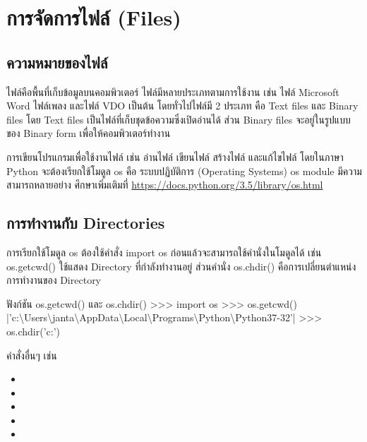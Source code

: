\chapter{การจัดการไฟล์ (Files)}
\section{ความหมายของไฟล์}

ไฟล์คือพื้นที่เก็บข้อมูลบนคอมพิวเตอร์ ไฟล์มีหลายประเภทตามการใช้งาน เช่น ไฟล์ Microsoft Word ไฟล์เพลง และไฟล์ VDO เป็นต้น โดยทั่วไปไฟล์มี 2 ประเภท คือ Text files และ Binary files โดย Text files เป็นไฟล์ที่เก็บชุดข้อความซึ่งเปิดอ่านได้ ส่วน Binary files จะอยู่ในรูปแบบของ Binary form เพื่อให้คอมพิวเตอร์ทำงาน

การเขียนโปรแกรมเพื่อใช้งานไฟล์ เช่น อ่านไฟล์ เขียนไฟล์ สร้างไฟล์ และแก้ไขไฟล์ โดยในภาษา Python จะต้องเรียกใช้โมดูล os คือ ระบบปฏิบัติการ (Operating Systems) os module มีความสามารถหลายอย่าง ศึกษาเพิ่มเติมที่ \url{https://docs.python.org/3.5/library/os.html}

\section{การทำงานกับ Directories}

การเรียกใช้โมดูล os ต้องใช้คำสั่ง import os ก่อนแล้วจะสามารถใช้คำนั่งในโมดูลได้ เช่น os.getcwd() ใช้แสดง Directory ที่กำลังทำงานอยู่ ส่วนคำนั่ง os.chdir() คือการเปลี่ยนตำแหน่งการทำงานของ Directory

\begin{codelist}{ฟังก์ชัน os.getcwd() และ os.chdir()}{}
>>> import os
>>> os.getcwd()
|\rq{}c:\textbackslash{}Users\textbackslash{}janta\textbackslash{}AppData\textbackslash{}Local\textbackslash{}Programs\textbackslash{}Python\textbackslash{}Python37-32\rq{}|
>>> os.chdir('c:\Users\janta\Desktop')
\end{codelist}

คำสั่งอื่นๆ เช่น 

\begin{itemize}
\item 	{}
\item 	{} 
\item 	{} 
\item 	{} 
\item 	{}
\end{itemize}

